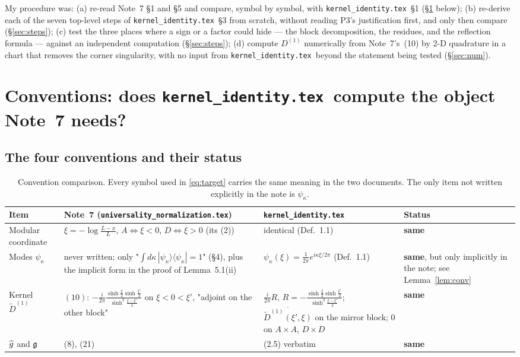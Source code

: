 \documentclass[11pt]{article}
\newcommand{\Dt}{\widetilde D^{(1)}}\newcommand{\Qt}{\widetilde Q}
\newcommand{\KI}{\texttt{kernel\_identity.tex}}\newcommand{\NOTE}{\texttt{universality\_normalization.tex}}
\begin{document}
My procedure was: (a) re-read Note~7 \S1 and \S5 and compare, symbol by symbol, with \KI\ \S1
(\S\ref{sec:conv} below); (b) re-derive each of the seven top-level steps of \KI\ \S3 from scratch,
without reading P3's justification first, and only then compare (\S\ref{sec:steps}); (c) test the
three places where a sign or a factor could hide --- the block decomposition, the residues, and the
reflection formula --- against an independent computation (\S\ref{sec:steps}); (d) compute
\(D^{(1)}\) numerically from Note~7's~(10) by 2-D quadrature in a chart that removes the corner
singularity, with no input from \KI\ beyond the statement being tested (\S\ref{sec:num}).

\section{Conventions: does \KI\ compute the object Note~7 needs?}\label{sec:conv}

\subsection{The four conventions and their status}

\begin{table}[h]\centering\footnotesize
\begin{tabular}{p{3.1cm}p{4.6cm}p{4.6cm}p{2.4cm}}\toprule
Item & Note~7 (\NOTE) & \KI & Status\\\midrule
Modular coordinate & \(\xi=-\log\frac{L-x}L\), \(A\Leftrightarrow\xi<0\),
 \(D\Leftrightarrow\xi>0\) (its (2)) & identical (Def.~1.1) & \textbf{same}\\[2pt]
Modes \(\psi_\kappa\) & never written; only "\(\int d\kappa\,|\psi_\kappa\rangle\langle\psi_\kappa|
 =1\)" (\S4), plus the implicit form in the proof of Lemma~5.1(ii) & \(\psi_\kappa(\xi)
 =\frac1{2\pi}e^{i\kappa\xi/2\pi}\) (Def.~1.1) & \textbf{same}, but only implicitly in the note;
 see Lemma~\ref{lem:conv}\\[2pt]
Kernel \(\Dt\) & \((10)\): \(-\frac i{2\pi}\frac{\sinh\frac\xi2\sinh\frac{\xi'}2}
 {\sinh^2\frac{\xi-\xi'}2}\) on \(\xi<0<\xi'\), "adjoint on the other block" & \(\frac i{2\pi}R\),
 \(R=-\frac{\sinh\frac\xi2\sinh\frac{\xi'}2}{\sinh^2\frac{\xi-\xi'}2}\); \(\overline{\Dt(\xi',\xi)}\)
 on the mirror block; \(0\) on \(A\times A\), \(D\times D\) & \textbf{same}\\[2pt]
\(\widehat g\) and \(\mathfrak g\) & (8), (21) & (2.5) verbatim & \textbf{same}\\
\bottomrule\end{tabular}
\caption{Convention comparison.  Every symbol used in \eqref{eq:target} carries the same meaning in
the two documents.  The only item not written explicitly in the note is \(\psi_\kappa\).}
\end{table}
\end{document}
